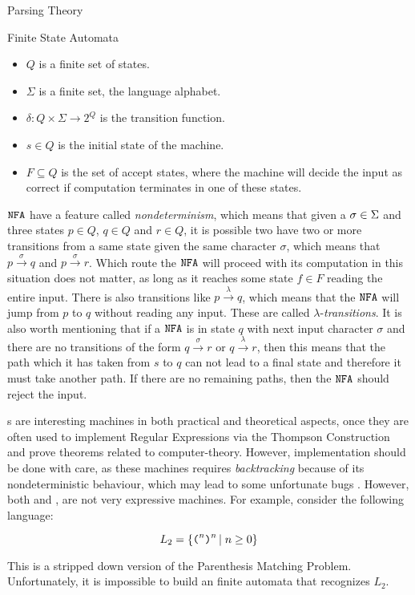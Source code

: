 \begin{section}{Parsing Theory}
\begin{subsection}{Finite State Automata}
\begin{definition}
\begin{itemize}
\item $Q$ is a finite set of states.
\item $\Sigma$ is a finite set, the language alphabet.
\item $\delta:Q\times\Sigma \longrightarrow 2^Q$ is the transition function.
\item $s \in Q$ is the initial state of the machine.
\item $F \subseteq Q$ is the set of accept states, where the machine will
decide the input as correct if computation terminates in one of these
states.
\end{itemize}
\end{definition}

$\texttt{NFA}$ have a feature called \textit{nondeterminism}, which means that given
a $\sigma \in \Sigma$ and three states $p \in Q$, $q \in Q$ and $r \in Q$, it is possible
two have two or more transitions from a same state given the same character $\sigma$, which
means that $p \overset{\sigma}{\longrightarrow} q$ and
$p \overset{\sigma}{\longrightarrow} r$. Which route the $\texttt{NFA}$ will proceed with
its computation in this situation does not matter, as long as it reaches some
state $f \in F$ reading the entire input. There is also transitions like
$p \overset{\lambda}{\longrightarrow} q$, which means that the $\texttt{NFA}$ will 
jump from $p$ to $q$ without reading any input. These are called
$\lambda$-\textit{transitions}. It is also worth mentioning that if a $\texttt{NFA}$
is in state $q$ with next input character $\sigma$ and there are no transitions
of the form $q \overset{\sigma}{\longrightarrow} r$ or
$q \overset{\lambda}{\longrightarrow} r$, then this means that the path which
it has taken from $s$ to $q$ can not lead to a final state and therefore it must
take another path. If there are no remaining paths, then the $\texttt{NFA}$ should
reject the input.

s are interesting machines in both practical and theoretical aspects,
once they are often used to implement Regular Expressions via the Thompson
Construction \citep{dragonbook} and prove theorems related to computer-theory.
However, implementation should be done with care, as these machines requires
\textit{backtracking} because of its nondeterministic behaviour, which may lead
to some unfortunate bugs \citep{PR86164}. However, both \DFA and \NFA, are not
very expressive machines. For example, consider the following language:

$$L_2 = \{\texttt{(}^n \texttt{)}^n\,|\;n \geq 0\}$$

This is a stripped down version of the Parenthesis Matching Problem.
Unfortunately, it is impossible to build an finite automata
that recognizes $L_2$.


\end{subsection}
\end{section}
